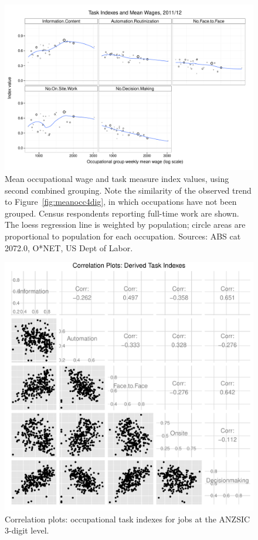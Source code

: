 \begin{figure}
  \centering
  \includegraphics[width=\textwidth]{../figure/wages_indexes.pdf}
  \caption{Mean occupational wage and task measure index values, using second combined grouping. Note the similarity of the observed trend to Figure~\ref{fig:meanocc4dig}, in which occupations have not been grouped. Census respondents reporting full-time work are shown. The loess regression line is weighted by population; circle areas are proportional to population for each occupation. Sources: ABS cat 2072.0, O*NET, US Dept of Labor.}
  \label{fig:meanocc2}
\end{figure}

\begin{figure}
  \centering
  \includegraphics[width=\textwidth]{../figure/correl.pdf}
  \caption{Correlation plots: occupational task indexes for jobs at the ANZSIC 3-digit level.}
  \label{fig:correl}
\end{figure}

